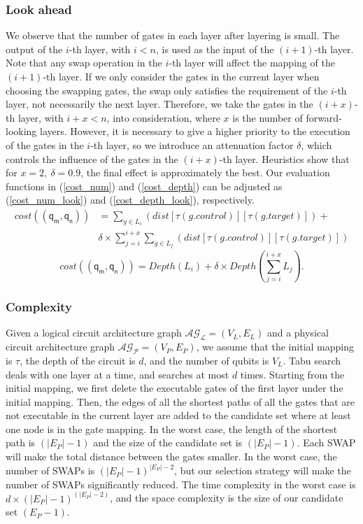 \documentclass[journal]{IEEEtran}
\begin{document}
\subsubsection{Look ahead}
We observe that the number of gates in each layer after layering is small. The output of the $i$-th layer, with $i<n$,  is used as the input of the $(i+1)$-th layer. Note that any swap operation in the $i$-th layer will affect the mapping of the $(i+1)$-th layer. If we only consider the gates in the current layer when choosing the swapping gates, the swap only satisfies the requirement of the $i$-th layer, not necessarily the next layer. Therefore, we take the gates in the $(i+x)$-th layer, with $i+x<n$,  into consideration, where $x$ is the number of forward-looking layers. However, it is necessary to give a higher priority to the execution of the gates in the $i$-th layer, so we introduce an attenuation factor $\delta$, which controls the influence of the gates in the $(i+x)$-th layer. Heuristics show that for $x=2,\ \delta=0.9$, the final effect is  approximately the best. Our evaluation functions in (\ref{cost_num}) and  (\ref{cost_depth}) can be adjusted as
(\ref{cost_num_look}) and  (\ref{cost_depth_look}), respectively.
 \begin{equation}
	 	\begin{aligned}
			cost((\textsf{q}_\textsf{m},\textsf{q}_\textsf{n}))&=\sum_{g \in L_{i}}(dist[\tau(g.control)][\tau(g.target)])+\\
	&\delta \times \sum_{j=i}^{i+x}\sum_{g \in L_{j}}(dist[\tau(g.control)][\tau(g.target)])
	\label{cost_num_look}
	\end{aligned}
 \end{equation}
	\begin{equation}
		cost((\textsf{q}_\textsf{m},\textsf{q}_\textsf{n}))= Depth(L_{i})+\delta \times Depth(\sum_{j=i}^{i+x}L_{j}).
		\label{cost_depth_look}
		\end{equation}
\subsubsection{Complexity}
Given a logical circuit architecture graph  $\mathcal{AG_{L}}=(V_{L},E_{L})$ and a physical circuit architecture graph $\mathcal{AG_{P}}=(V_{P},E_{P})$, we assume that the initial mapping is $\tau$, the depth of the circuit is $d$, and the number of qubits is $V_{L}$. Tabu search deals with one layer at a time, and searches at most $d$ times. Starting from the initial mapping, we first delete the executable gates of the first layer under the initial mapping. Then, the edges of all the shortest paths of all the gates that are not executable in the current layer are added to the candidate set where at least one node is in the gate mapping. In the worst case, the length of the shortest path  is $(|E_{P}|-1)$
and the size of the candidate set  is $(|E_{P}|-1)$. Each SWAP will make the total distance between the gates smaller. In the worst case, the number of SWAPs is $(|E_{P}|-1)^{|E_{P}|-2}$, but our selection strategy will make the number of SWAPs significantly reduced. The time complexity in the worst case is $d\times (|E_{P}|-1)^{(|E_{P}|-2)}$, and the space complexity is the size of our candidate set $(E_{P}-1)$.
\end{document}

